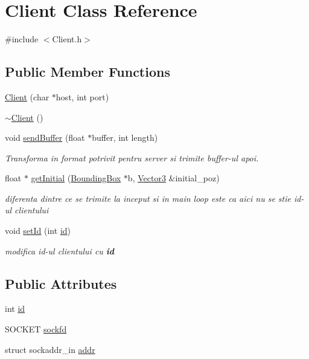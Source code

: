\hypertarget{class_client}{\section{Client Class Reference}
\label{class_client}
}


{\ttfamily \#include $<$Client.\-h$>$}

\subsection*{Public Member Functions}
\begin{DoxyCompactItemize}
\item 
\hyperlink{class_client_a058502e832c9ccee2b5e01703906200d}{Client} (char $\ast$host, int port)
\item 
\hyperlink{class_client_a840e519ca781888cbd54181572ebe3a7}{$\sim$\-Client} ()
\item 
void \hyperlink{class_client_af7b0225d6f8c98740f2e7e8bd9510a0a}{send\-Buffer} (float $\ast$buffer, int length)
\begin{DoxyCompactList}\small\item\em Transforma in format potrivit pentru server si trimite buffer-\/ul apoi. \end{DoxyCompactList}\item 
float $\ast$ \hyperlink{class_client_a8a2c291186464693206935dc6fe4b460}{get\-Initial} (\hyperlink{class_bounding_box}{Bounding\-Box} $\ast$b, \hyperlink{struct_vector3}{Vector3} \&initial\-\_\-poz)
\begin{DoxyCompactList}\small\item\em diferenta dintre ce se trimite la inceput si in main loop este ca aici nu se stie id-\/ul clientului \end{DoxyCompactList}\item 
void \hyperlink{class_client_a5399a902d687bee18fc1ac739c26c563}{set\-Id} (int \hyperlink{class_client_ab79ad95264939f089a2f0b8e0ca62d37}{id})
\begin{DoxyCompactList}\small\item\em modifica id-\/ul clientului cu {\bfseries id} \end{DoxyCompactList}\end{DoxyCompactItemize}
\subsection*{Public Attributes}
\begin{DoxyCompactItemize}
\item 
int \hyperlink{class_client_ab79ad95264939f089a2f0b8e0ca62d37}{id}
\item 
S\-O\-C\-K\-E\-T \hyperlink{class_client_a030e7dcdc06639d4132975acea6ebaea}{sockfd}
\item 
struct sockaddr\-\_\-in \hyperlink{class_client_a28dc9c1d93c197c83e82262783c7b9f3}{addr}
\end{DoxyCompactItemize}
